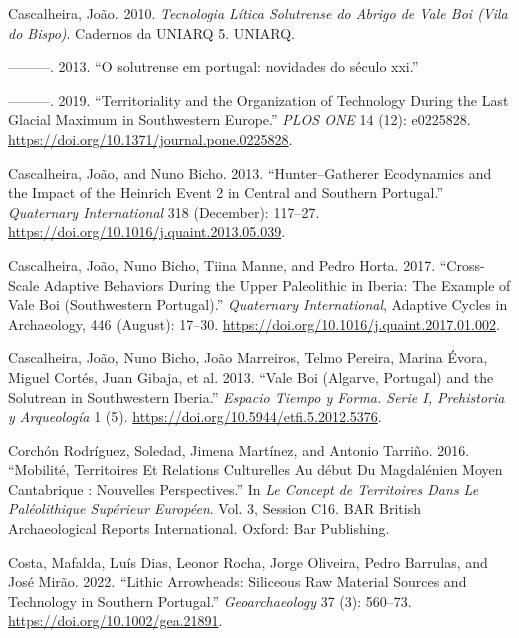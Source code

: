 \documentclass[
  a4paper,
  DIV=11,
  numbers=noendperiod]{scrreprt}
\newlength{\cslhangindent}
\newenvironment{CSLReferences}[2] %
 {\begin{list}{}{%
  \setlength{\itemindent}{0pt}
  \setlength{\leftmargin}{0pt}
  \setlength{\parsep}{0pt}
  \ifodd #1
   \setlength{\leftmargin}{\cslhangindent}
   \setlength{\itemindent}{-1\cslhangindent}
  \fi
  \setlength{\itemsep}{#2\baselineskip}}}
 {\end{list}}
\begin{document}
\begin{CSLReferences}{1}{0}
Cascalheira, João. 2010. \emph{{Tecnologia L{í}tica Solutrense do Abrigo
de Vale Boi (Vila do Bispo)}}. {Cadernos da UNIARQ} 5. UNIARQ.

---------. 2013. {``{O solutrense em portugal: novidades do s{é}culo
xxi}.''}

---------. 2019. {``Territoriality and the Organization of Technology
During the {Last Glacial Maximum} in Southwestern {Europe}.''}
\emph{PLOS ONE} 14 (12): e0225828.
\url{https://doi.org/10.1371/journal.pone.0225828}.

Cascalheira, João, and Nuno Bicho. 2013. {``Hunter--Gatherer Ecodynamics
and the Impact of the {Heinrich} Event 2 in {Central} and {Southern
Portugal}.''} \emph{Quaternary International} 318 (December): 117--27.
\url{https://doi.org/10.1016/j.quaint.2013.05.039}.

Cascalheira, João, Nuno Bicho, Tiina Manne, and Pedro Horta. 2017.
{``Cross-Scale Adaptive Behaviors During the {Upper Paleolithic} in
{Iberia}: {The} Example of {Vale Boi} ({Southwestern Portugal}).''}
\emph{Quaternary International}, Adaptive {Cycles} in {Archaeology}, 446
(August): 17--30. \url{https://doi.org/10.1016/j.quaint.2017.01.002}.

Cascalheira, João, Nuno Bicho, João Marreiros, Telmo Pereira, Marina
Évora, Miguel Cortés, Juan Gibaja, et al. 2013. {``Vale {Boi}
({Algarve}, {Portugal}) and the {Solutrean} in {Southwestern Iberia}.''}
\emph{Espacio Tiempo y Forma. Serie I, Prehistoria y Arqueolog{í}a} 1
(5). \url{https://doi.org/10.5944/etfi.5.2012.5376}.

Corchón Rodríguez, Soledad, Jimena Martínez, and Antonio Tarriño. 2016.
{``Mobilit{é}, Territoires Et Relations Culturelles Au d{é}but Du
{Magdal{é}nien} Moyen Cantabrique : Nouvelles Perspectives.''} In
\emph{Le Concept de Territoires Dans Le {Pal{é}olithique} Sup{é}rieur
Europ{é}en}. Vol. 3, Session C16. {BAR British Archaeological Reports
International}. Oxford: Bar Publishing.

Costa, Mafalda, Luís Dias, Leonor Rocha, Jorge Oliveira, Pedro Barrulas,
and José Mirão. 2022. {``Lithic Arrowheads: {Siliceous} Raw Material
Sources and Technology in {Southern Portugal}.''} \emph{Geoarchaeology}
37 (3): 560--73. \url{https://doi.org/10.1002/gea.21891}.


\end{CSLReferences}
\end{document}
